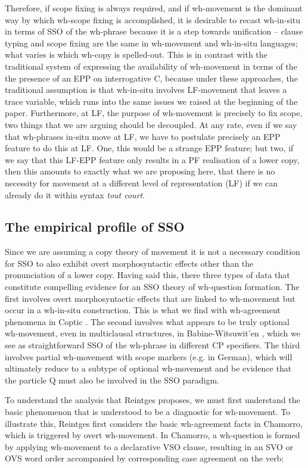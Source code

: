\documentclass[charis]{glossa}
\begin{document}
Therefore, if scope fixing is always required, and if wh-movement is the dominant way by which wh-scope fixing is accomplished, it is desirable to recast wh-in-situ in terms of SSO of the wh-phrase because it is a step towards unification -- clause typing and scope fixing are the same in wh-movement and wh-in-situ languages; what varies is which wh-copy is spelled-out. This is in contrast with the traditional system of expressing the availability of wh-movement in terms of the the presence of an EPP on interrogative C, because under these approaches, the traditional assumption is that wh-in-situ involves LF-movement that leaves a trace variable, which runs into the same issues we raised at the beginning of the paper. Furthermore, at LF, the purpose of wh-movement is precisely to fix scope, two things that we are arguing should be decoupled. At any rate, even if we say that wh-phrases in-situ move at LF, we have to postulate precisely an EPP feature to do this at LF. One, this would be a strange EPP feature; but two, if we say that this LF-EPP feature only results in a PF realisation of a lower copy, then this amounts to exactly what we are proposing here, that there is no necessity for movement at a different level of representation (LF) if we can already do it within syntax \textit{tout court}.

\subsection{The empirical profile of SSO}
Since we are assuming a copy theory of movement it is not a necessary condition for SSO to also exhibit overt morphosyntactic effects other than the pronunciation of a lower copy. Having said this, there three types of data that constitute compelling evidence for an SSO theory of wh-question formation. The first involves overt morphosyntactic effects that are linked to wh-movement but occur in a wh-in-situ construction.  This is what we find with wh-agreement phenomena in Coptic \citep{rlc:2006, reintges:2007}. The second involves what appears to be truly optional wh-movement, even in multiclausal structures, in Babine-Witsuwit'en \citep{denham:1997, denham:00}, which we see as straightforward SSO of the wh-phrase in different CP specifiers. The third involves partial wh-movement with scope markers (e.g. in German), which will ultimately reduce to a subtype of optional wh-movement and be evidence that the particle Q must also be involved in the SSO paradigm.

To understand the analysis that Reintges proposes, we must first understand the basic phenomenon that is understood to be a diagnostic for wh-movement. To illustrate this, Reintges first considers the basic wh-agreement facts in Chamorro, which is triggered by overt wh-movement. In Chamorro, a wh-question is formed by applying wh-movement to a declarative VSO clause, resulting in an SVO or OVS word order accompanied by corresponding case agreement on the verb:
\end{document}
